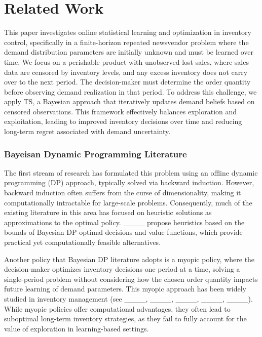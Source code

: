 \section{Related Work}
\label{sec:related work}

This paper investigates online statistical learning and optimization in inventory control, specifically in a finite-horizon repeated newsvendor problem where the demand distribution parameters are initially unknown and must be learned over time. We focus on a perishable product with unobserved lost-sales, where sales data are censored by inventory levels, and any excess inventory does not carry over to the next period. The decision-maker must determine the order quantity before observing demand realization in that period. To address this challenge, we apply TS, a Bayesian approach that iteratively updates demand beliefs based on censored observations. This framework effectively balances exploration and exploitation, leading to improved inventory decisions over time and reducing long-term regret associated with demand uncertainty.
\subsubsection{Bayeisan Dynamic Programming Literature}
The first stream of research has formulated this problem using an offline dynamic programming (DP) approach, typically solved via backward induction. However, backward induction often suffers from the curse of dimensionality, making it computationally intractable for large-scale problems. %
Consequently, much of the existing literature in this area has focused on heuristic solutions as approximations to the optimal policy. ____ propose heuristics based on the bounds of Bayesian DP-optimal decisions and value functions, which provide practical yet computationally feasible alternatives.

Another policy that Bayesian DP literature adopts is a myopic policy, where the decision-maker optimizes inventory decisions one period at a time, solving a single-period problem without considering how the chosen order quantity impacts future learning of demand parameters. This myopic approach has been widely studied in inventory management (see ____, ____, ____, ____, ____). While myopic policies offer computational advantages, they often lead to suboptimal long-term inventory strategies, as they fail to fully account for the value of exploration in learning-based settings.


